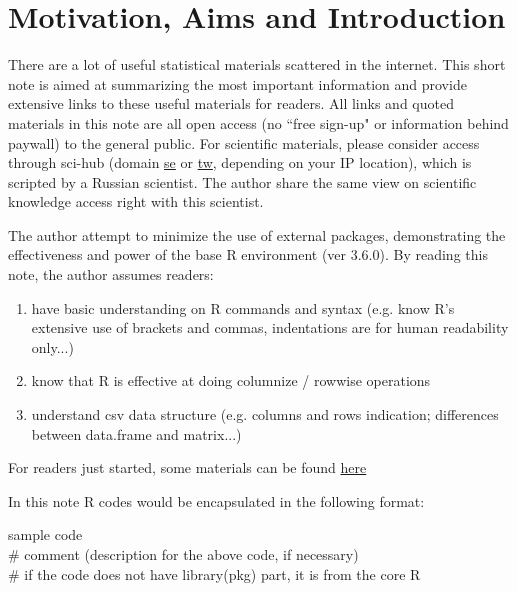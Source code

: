\documentclass[../note.tex]{subfiles} %
\begin{document}
\section{Motivation, Aims and Introduction}
There are a lot of useful statistical materials scattered in the internet.  This short note is aimed at summarizing the most important information and provide extensive links to these useful materials for readers.  All links and quoted materials in this note are all open access (no ``free sign-up" or information behind paywall) to the general public.  For scientific materials, please consider access through sci-hub (domain \href{https://sci-hub.se/}{se} or \href{https://sci-hub.tw/}{tw}, depending on your IP location), which is scripted by a Russian scientist.  The author share the same view on scientific knowledge access right with this scientist.

The author attempt to minimize the use of external packages, demonstrating the effectiveness and power of the base R\autocite{Rcore} environment (ver 3.6.0).  By reading this note, the author assumes readers:
\begin{enumerate}
    \item have basic understanding on R commands and syntax (e.g. know R's extensive use of brackets and commas, indentations are for human readability only...)
    \item know that R is effective at doing columnize / rowwise operations
    \item understand csv data structure (e.g. columns and rows indication; differences between data.frame and matrix...)
\end{enumerate}

For readers just started, some materials can be found \href{https://www.r-bloggers.com/how-to-learn-r-2/}{here}

In this note R codes would be encapsulated in the following format:
\begin{code}
    sample code\\
    \# comment (description for the above code, if necessary)\\
    \# if the code does not have library(pkg) part, it is from the core R
\end{code}
\end{document}
